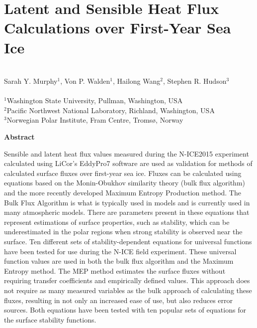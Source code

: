 \chapter{Latent and Sensible Heat Flux Calculations over First-Year Sea Ice}




\\
\noindent Sarah Y. Murphy$^1$, Von P. Walden$^1$, Hailong Wang$^2$, Stephen R. Hudson$^3$\\

\\
\noindent $^1$Washington State University, Pullman, Washington, USA\\
$^2$Pacific Northwest National Laboratory, Richland, Washington, USA\\
$^3$Norwegian Polar Institute, Fram Centre, Tromsø, Norway\\

\begin{spacing}{1}

\noindent \textbf{Abstract}

 \noindent Sensible and latent heat flux values measured during the N-ICE2015 experiment calculated using LiCor’s EddyPro7 software are used as validation for methods of calculated surface fluxes over first-year sea ice. Fluxes can be calculated using equations based on the Monin-Obukhov similarity theory (bulk flux algorithm) and the more recently developed Maximum Entropy Production method. The Bulk Flux Algorithm is what is typically used in models and is currently used in many atmospheric models. There are parameters present in these equations that represent estimations of surface properties, such as stability, which can be underestimated in the polar regions when strong stability is observed near the surface. Ten different sets of stability-dependent equations for universal functions have been tested for use during the N-ICE field experiment. These universal function values are used in both the bulk flux algorithm and the Maximum Entropy method. The MEP method estimates the surface fluxes without requiring transfer coefficients and empirically defined values. This approach does not require as many measured variables as the bulk approach of calculating these fluxes, resulting in not only an increased ease of use, but also reduces error sources. Both equations have been tested with ten popular sets of equations for the surface stability functions. 
\end{spacing}

